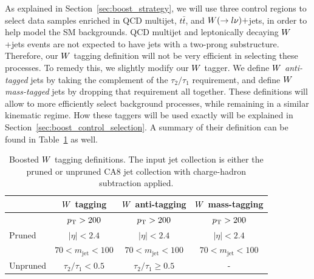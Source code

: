 As explained in Section~\ref{sec:boost_strategy}, we will use three control regions to select data
samples enriched in QCD multijet, $t\bar{t}$, and $W(\rightarrow l \nu)+$jets, in order to help
model the SM backgrounds. QCD multijet and leptonically decaying $W$+jets events are not expected
to have jets with a two-prong substructure. Therefore, our $W$ tagging definition will not be very
efficient in selecting these processes. To remedy this, we slightly modify our $W$ tagger. 
We define $W$ \textit{anti-tagged} jets by taking the complement of the $\tau_2 / \tau_1$
requirement, and define $W$ \textit{mass-tagged} jets by dropping that requirement all together. 
These definitions will allow to more efficiently select background processes, while remaining in a
similar kinematic regime. How these taggers will be used exactly will be explained in
Section~\ref{sec:boost_control_selection}. A summary of their definition can be found in
Table~\ref{tab:Wtag_definition} as well. 

\begin{table}[htdp]
\caption{Boosted $W$ tagging definitions. The input jet collection is either the pruned or unpruned
CA8 jet collection with charge-hadron subtraction applied. }
\vspace{1ex}
\centering
\begin{tabular}{l c c c}
\toprule
& $W$ tagging & $W$ anti-tagging & $W$ mass-tagging  \\
\midrule
\multirow{3}{*}{Pruned} & $p_{\mathrm{T}} > 200$  & $p_{\mathrm{T}} > 200$  & $p_{\mathrm{T}} > 200$\\
& $|\eta| < 2.4$ & $|\eta| < 2.4$ & $|\eta| < 2.4$\\
& $70 < m_{\textrm{jet}}< 100$ & $70 < m_{\textrm{jet}}< 100$ & $70 < m_{\textrm{jet}}< 100$\\
\midrule
Unpruned & $\tau_2 / \tau_1 < 0.5$ & $\tau_2 / \tau_1 \geq 0.5$ & -\\
\bottomrule
\end{tabular}
\label{tab:Wtag_definition}
\end{table}




